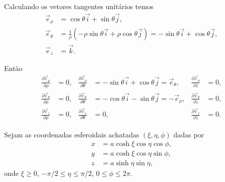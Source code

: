 \documentclass[a4paper,12pt, leqno, answers]{exam}
\newcommand{\devp}[2]{\frac{\partial #1}{\partial #2}}
\begin{document}
\begin{questions}
\begin{solution}
        Calculando os vetores tangentes unit\'{a}rios temos
        \begin{align*}
            \vec{e}_\rho &= \cos \theta \vec{i} + \sin \theta \vec{j}, \\
            \vec{e}_\theta &= \frac{1}{\rho} \left(-\rho \sin \theta \vec{i} + \rho \cos \theta \vec{j}\right) = -\sin \theta \vec{i} + \cos \theta \vec{j}, \\
            \vec{e}_z &= \vec{k}.
        \end{align*}
  
        Ent\~{a}o
        \begin{align*}
            \devp{\vec{e}_\rho}{\rho} &= 0, & 
            \devp{\vec{e}_\rho}{\theta} &= -\sin \theta \vec{i} + \cos \theta \vec{j} = \vec{e}_\theta, &
            \devp{\vec{e}_\rho}{z} &= 0, \\
            \devp{\vec{e}_\theta}{\rho} &= 0, &
            \devp{\vec{e}_\theta}{\theta} &= - \cos \theta \vec{i} - \sin \theta \vec{j} = - \vec{e}_\rho, &
            \devp{\vec{e}_\theta}{z} &= 0, \\
            \devp{\vec{e}_z}{\rho} &= 0, &
            \devp{\vec{e}_z}{\theta} &= 0, &
            \devp{\vec{e}_z}{z} &= 0.
        \end{align*}
    \end{solution}
  
    \question Sejam as coordenadas esferoidais achatadas $(\xi, \eta, \phi)$ dadas por
    \begin{align*}
        x &= a \cosh \xi \cos \eta \cos \phi, \\
        y &= a \cosh \xi \cos \eta \sin \phi, \\
        z &= a \sinh \eta \sin \eta,
    \end{align*}
    onde $\xi \geq 0$, $-\pi/2 \leq \eta \leq \pi/2$, $0 \leq \phi \leq 2\pi$.
    

\end{questions}
\end{document}
